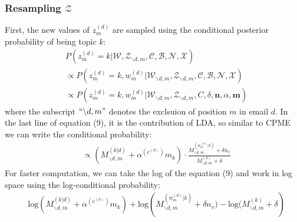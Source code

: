 \documentclass[a4paper]{article}
\begin{document}
\subsubsection{Resampling $\mathcal{Z}$}
First, the new values of $z^{(d)}_m$ are sampled using the conditional posterior probability of being topic $k$:
\begin{equation}
\begin{aligned} & P(z^{(d)}_m=k|\mathcal{W}, \mathcal{Z}_{\backslash d,m}, \mathcal{C}, \mathcal{B}, \mathcal{N}, \mathcal{X})\\ &\propto P(z^{(d)}_m=k, w^{(d)}_m|\mathcal{W}_{\backslash d, m}, \mathcal{Z}_{\backslash d,m}, \mathcal{C}, \mathcal{B}, \mathcal{N}, \mathcal{X})\\
& \propto P(z^{(d)}_m=k, w^{(d)}_m|\mathcal{W}_{\backslash d, m}, \mathcal{Z}_{\backslash d,m}, C, \delta, \boldsymbol{n}, \alpha, \boldsymbol{m})
\end{aligned}
\end{equation}
where the subscript $``{\backslash d, m}"$ denotes the exclsuion of position $m$ in email $d$. In the last line of equation (9), it is the contribution of LDA, so similar to CPME we can write the conditional probability:
	\begin{equation}
	\begin{aligned} 
	& \propto ({M}^{(k|d)}_{\backslash d, m}+\alpha^{(c^{(d)})}m_k)\cdot \frac{{M}^{(w_m^{(d)}|k)}_{\backslash d, m}+\delta n_v}{{M}^{(k)}_{\backslash d, m}+\delta}
	\end{aligned}
	\end{equation}
\newline 
	For faster computation, we can take the log of the equation (9) and work in log space using the log-conditional probability:
		\begin{equation}
		\begin{aligned} 
		& \mbox{log}({M}^{(k|d)}_{\backslash d, m}+\alpha^{(c^{(d)})}m_k)+\mbox{log}( {{M}^{(w_m^{(d)}|k)}_{\backslash d, m}+\delta n_v)-\mbox{log}({M}^{(k)}_{\backslash d, m}+\delta}) 
		\end{aligned}
		\end{equation}
\end{document}
